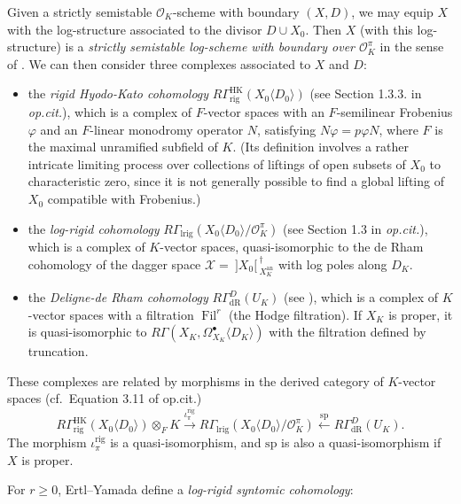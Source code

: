 \documentclass[cjm]{ipart}
\theoremstyle{plain}
\theoremstyle{remark}
\DeclareMathOperator{\Fil}{Fil}
\DeclareMathOperator{\HK}{HK}
\DeclareMathOperator{\lrig}{lrig}
\newcommand{\cO}{\mathcal{O}}
\newcommand{\cX}{\mathcal{X}}
\newcommand{\dR}{\mathrm{dR}}
\newcommand{\rig}{\mathrm{rig}}
\numberwithin{equation}{subsection}
\renewcommand{\geq}{\geqslant}
\begin{document}
  Given a strictly semistable $\cO_K$-scheme with boundary $(X, D)$, we may equip $X$ with the log-structure associated to the divisor $D \cup X_0$. Then $X$ (with this log-structure) is a \emph{strictly semistable log-scheme with boundary over $\cO_K^{\pi}$} in the sense of \cite[Definition 3.3]{ertlyamada18}. We can then consider three complexes associated to $X$ and $D$:
  \begin{itemize}
   \item the \emph{rigid Hyodo-Kato cohomology} $R\Gamma^{\HK}_{\rig}(X_0\langle D_0\rangle)$ (see Section 1.3.3. in \emph{op.cit.}), which is a complex of $F$-vector spaces with an $F$-semilinear Frobenius $\varphi$ and an $F$-linear monodromy operator $N$, satisfying $N\varphi = p \varphi N$, where $F$ is the maximal unramified subfield of $K$. (Its definition involves a rather intricate limiting process over collections of liftings of open subsets of $X_0$ to characteristic zero, since it is not generally possible to find a global lifting of $X_0$ compatible with Frobenius.)

   \item the \emph{log-rigid cohomology} $R\Gamma_{\lrig}(X_0 \langle D_0\rangle / \cO_K^\pi)$ (see Section 1.3 in \emph{op.cit.}), which is a complex of $K$-vector spaces, quasi-isomorphic to the de Rham cohomology of the dagger space $\cX =\  ]X_0[\,_{X_K^{\mathrm{an}}}^\dag$ with log poles along $D_K$.

   \item the \emph{Deligne-de Rham cohomology} $R\Gamma_{\dR}^D(U_K)$ (see \cite{deligne74}), which is a complex of $K$-vector spaces with a filtration $\Fil^r$ (the Hodge filtration). If $X_K$ is proper, it is quasi-isomorphic to $R\Gamma(X_K, \Omega^\bullet_{X_K}\langle D_K \rangle)$ with the filtration defined by truncation.
  \end{itemize}

  \begin{note}
   These complexes are related by morphisms in the derived category of $K$-vector spaces (cf.~Equation 3.11 of op.cit.)
   \[
    R\Gamma^{\HK}_{\rig}(X_0\langle D_0\rangle) \otimes_F K\xrightarrow{\iota_{\pi}^{\rig}} R\Gamma_{\lrig}(X_0\langle D_0\rangle / \cO_K^\pi) \xleftarrow{\,\mathrm{sp}\,} R\Gamma^D_{\dR}(U_K).
   \]
   The morphism $\iota_{\pi}^{\rig}$ is a quasi-isomorphism, and $\mathrm{sp}$ is also a quasi-isomorphism if $X$ is proper.
  \end{note}

  For $r\geq 0$, Ertl--Yamada \cite[Definition 3.4]{ertlyamada18} define a \emph{log-rigid syntomic cohomology}:
\end{document}
